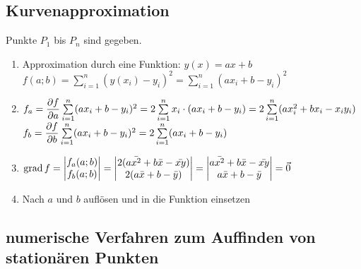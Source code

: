 \subsection{Kurvenapproximation}
  Punkte $P_1$ bis $P_n$ sind gegeben.
  \begin{enumerate}
    \item 
      Approximation durch eine Funktion: $y(x) = ax+b$\\
      $f(a;b) = \sum\limits_{i=1}^{n} (y(x_i)-y_i)^2 = \sum\limits_{i=1}^{n} (ax_i+b-y_i)^2$\\
    \item
      $f_a = \dfrac{\partial f}{\partial a} \sum\limits_{i=1}^{n} (ax_i+b-y_i)^2 = 2 \sum\limits_{i=1}^{n}x_i\cdot (ax_i+b-y_i)
      = 2 \sum\limits_{i=1}^{n}(ax_i^2+bx_i-x_iy_i)$ \\
      $f_b = \dfrac{\partial f}{\partial b} \sum\limits_{i=1}^{n} (ax_i+b-y_i)^2 = 2 \sum\limits_{i=1}^{n} (ax_i+b-y_i)$ \\
    \item
      $\operatorname{grad} f = \left|\begin{matrix}
        f_a(a;b) \\
        f_b(a;b)
      \end{matrix} \right| = \left| \begin{matrix}
        2(a\bar{x^2} + b\bar{x} - \bar{xy}) \\
        2(a\bar{x} + b - \bar{y})
      \end{matrix} \right| = \left| \begin{matrix}
        a\bar{x^2} + b\bar{x} - \bar{xy} \\
        a\bar{x} + b - \bar{y}
      \end{matrix} \right| = \vec{0}$ \\
    \item
      Nach $a$ und $b$ auflösen und in die Funktion einsetzen
  \end{enumerate}
    
\subsection{numerische Verfahren zum Auffinden von stationären Punkten}
